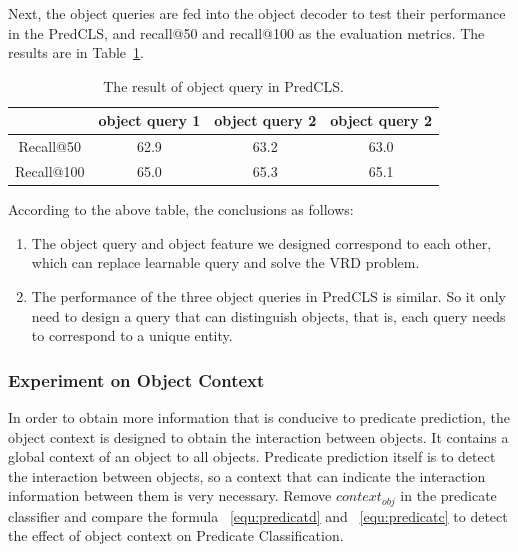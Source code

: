 Next, the object queries are fed into the object decoder to test their performance in the PredCLS, and recall@50 and recall@100 as the evaluation metrics. The results are in Table~\ref{tab:result_object _query}.

\begin{table}[!h]
	\centering
	\begin{tabular}{c|ccc}
		\hline
		& object query 1 & object query 2 & object query 2 \\ \hline
		Recall@50  & 62.9            & 63.2            & 63.0              \\
		Recall@100 & 65.0             & 65.3              & 65.1              \\ \hline
	\end{tabular}

\caption[The result of object query in PredCLS]{The result of object query in PredCLS.}
\label{tab:result_object _query}
\end{table}

According to the above table,  the conclusions as follows:

\begin{enumerate}
	\item The object query and object feature we designed correspond to each other, which can replace learnable query and solve the VRD problem.
	\item The performance of the three object queries in PredCLS is similar. So it only need to design a query that can distinguish objects, that is, each query needs to correspond to a unique entity. 
\end{enumerate}

\subsubsection{Experiment on Object Context}
In order to obtain more information that is conducive to predicate prediction, the object context is designed to obtain the interaction between objects. It contains a global context of an object to all objects. Predicate prediction itself is to detect the interaction between objects, so a context that can indicate the interaction information between them is very necessary. Remove $ context_{obj }$ in the predicate classifier and compare the formula ~\ref{equ:predicatd}  and ~\ref{equ:predicatc} to detect the effect of object context on Predicate Classification.

